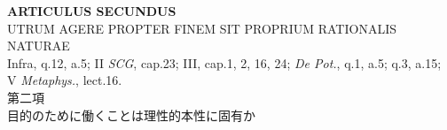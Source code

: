 \documentclass[paper=a4paper,fontsize=10pt,jafontsize=9pt,titlepage]{jlreq}
\begin{document}
\newpage










{}
\setcounter{section}{2}
\setcounter{subsection}{0}
\begin{center}
 {\Large {\bfseries ARTICULUS SECUNDUS}}\\
 {\large UTRUM AGERE PROPTER FINEM SIT PROPRIUM RATIONALIS NATURAE}\\
 {\footnotesize Infra, q.12, a.5; II {\itshape SCG}, cap.23; III, cap.1,
 2, 16, 24; {\itshape De Pot.}, q.1, a.5; q.3, a.15; V {\itshape
 Metaphys.}, lect.16.}\\
 {\Large 第二項\\目的のために働くことは理性的本性に固有か}
\end{center}
\end{document}
